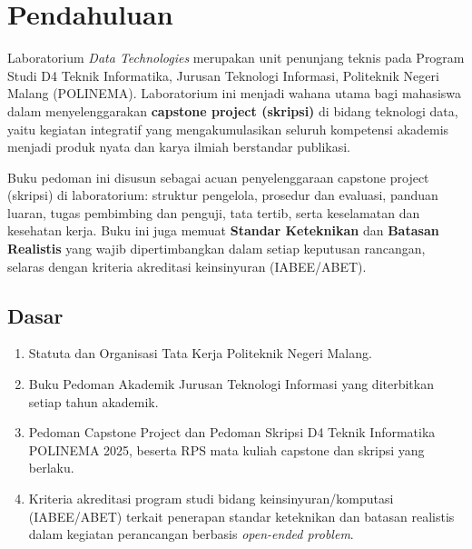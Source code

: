 \documentclass[12pt,a4paper]{report}
\begin{document}
\PedomanCover

\clearpage
\tableofcontents

\clearpage
{}

\chapter{Pendahuluan}

Laboratorium \emph{Data Technologies} merupakan unit penunjang teknis pada Program Studi D4 Teknik Informatika, Jurusan Teknologi Informasi, Politeknik Negeri Malang (POLINEMA). Laboratorium ini menjadi wahana utama bagi mahasiswa dalam menyelenggarakan \textbf{capstone project (skripsi)} di bidang teknologi data, yaitu kegiatan integratif yang mengakumulasikan seluruh kompetensi akademis menjadi produk nyata dan karya ilmiah berstandar publikasi.

Buku pedoman ini disusun sebagai acuan penyelenggaraan capstone project (skripsi) di laboratorium: struktur pengelola, prosedur dan evaluasi, panduan luaran, tugas pembimbing dan penguji, tata tertib, serta keselamatan dan kesehatan kerja. Buku ini juga memuat \textbf{Standar Keteknikan} dan \textbf{Batasan Realistis} yang wajib dipertimbangkan dalam setiap keputusan rancangan, selaras dengan kriteria akreditasi keinsinyuran (IABEE/ABET).

\section{Dasar}
\begin{enumerate}
\item Statuta dan Organisasi Tata Kerja Politeknik Negeri Malang.
\item Buku Pedoman Akademik Jurusan Teknologi Informasi yang diterbitkan setiap tahun akademik.
\item Pedoman Capstone Project dan Pedoman Skripsi D4 Teknik Informatika POLINEMA 2025, beserta RPS mata kuliah capstone dan skripsi yang berlaku.
\item Kriteria akreditasi program studi bidang keinsinyuran/komputasi (IABEE/ABET) terkait penerapan standar keteknikan dan batasan realistis dalam kegiatan perancangan berbasis \emph{open-ended problem}.
\end{enumerate}
\end{document}
